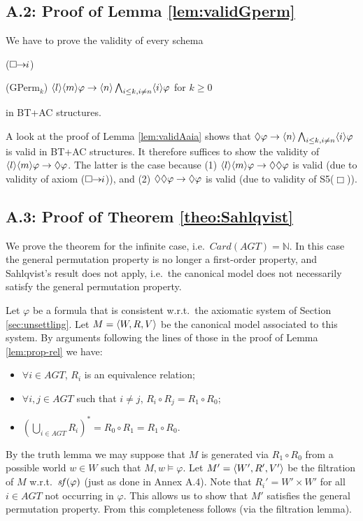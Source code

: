 \documentclass{article}
\renewcommand{\phi}{\varphi}
\newcommand{\card}[1]{\mathit{Card}(#1)}           \newcommand{\ext}[1]{|#1|}
\newcommand{\InclBox}[1]{$\Box \!\! \imp \!\! #1$}
\newcommand{\agtset}{\ensuremath{\mathit{AGT}}}
\begin{document}
\subsection*{A.2: Proof of Lemma \ref{lem:validGperm}}

We have to prove the validity of every schema
\begin{itemlist}{(\InclBox{i})}
\item[(GPerm$_k$)]
$\poscstit{l}\poscstit{m}\phi \imp
\poscstit{n}\bigwedge_{i\leq k, i \not = n} \poscstit{i}\phi$  \hfill for $k \geq 0$
\end{itemlist}
in BT+AC structures.

A look at the proof of Lemma \ref{lem:validAaia} shows that
$\Diamond \phi \imp
\poscstit{n}\bigwedge_{i\leq k, i \not = n} \poscstit{i}\phi$
is valid in BT+AC structures.
It therefore suffices to show the validity of
$\poscstit{l}\poscstit{m}\phi \imp \Diamond \phi $.
The latter is the case because
(1) $\poscstit{l}\poscstit{m}\phi \imp \Diamond \Diamond \phi $ is valid
(due to validity of axiom (\InclBox{i})), and
(2) $\Diamond \Diamond \phi \imp \Diamond \phi $ is valid
(due to validity of S5($\Box$)).


\subsection*{A.3: Proof of Theorem \ref{theo:Sahlqvist}}

We prove the theorem for the infinite case, i.e.\ $\card{\agtset} = \mathbb{N}$.
In this case the general permutation property is no longer a first-order property,
and Sahlqvist's result does not apply, i.e.\ the canonical model does not
necessarily satisfy the general permutation property.

Let $\phi$ be a formula that is consistent w.r.t.\ the axiomatic system
of Section \ref{sec:unsettling}.
Let $M = \langle W, R, V \rangle$ be the canonical model associated to this system.
By arguments following the lines of those in the proof of Lemma \ref{lem:prop-rel} we have:
\begin{itemize}
\item $\forall i   \in \agtset$, $R_i$ is an equivalence relation;
\item $\forall i,j \in \agtset$ such that $i \not = j$, $R_i \circ R_j = R_1 \circ R_0$;
\item $(\bigcup_{i \in \agtset} R_i)^* = R_0 \circ R_1 = R_1 \circ R_0$.
\end{itemize}
By the truth lemma we may suppose that $M $ is generated via $R_1 \circ R_0$
from a possible world $w\in W$ such that $M,w \models \phi$.
Let $M' = \langle W', R', V' \rangle $ be the filtration of $M$ w.r.t.\ $\subfml(\phi)$
(just as done in Annex A.4).
Note that $R_i' = W' \times W' $ for all $i\in \agtset $ not occurring in $\phi$.
This allows us to show that $M' $ satisfies the general permutation property.
From this completeness follows (via the filtration lemma).
\end{document}

